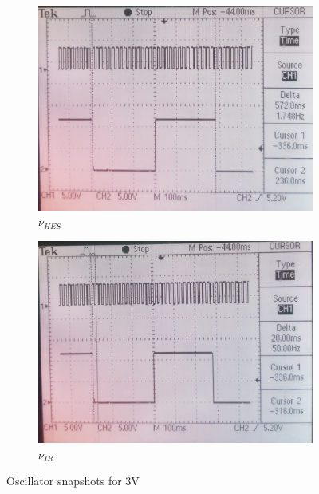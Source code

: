 \documentclass[12pt]{article}
\begin{document}
\begin{figure}[H]
	\begin{subfigure}[b]{0.5\linewidth}		
		\includegraphics[width = \linewidth, trim = {0 0 0 0}, clip]{HES3V.jpg}
		\caption{\( \nu_{HES} \)}
	\end{subfigure}
	\begin{subfigure}[b]{0.5\linewidth}						
		\includegraphics[width = \linewidth, trim = {0 0 0 0}, clip]{IR3V.jpg}
		\caption{\( \nu_{IR} \)}
	\end{subfigure}
	\caption{Oscillator snapshots for 3V}
\end{figure}
\end{document}
